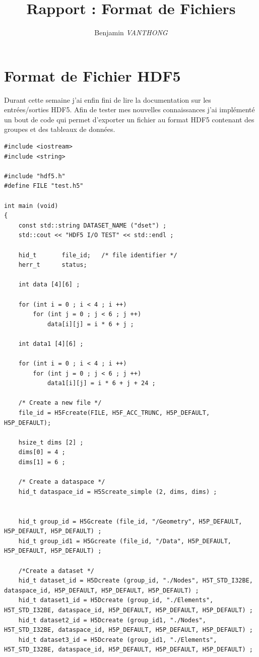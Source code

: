 \documentclass[12pt]{article}
\title {Rapport : Format de Fichiers}
\author {Benjamin \emph{VANTHONG}}
\begin{document}
\maketitle 
\section {Format de Fichier HDF5}

Durant cette semaine j'ai enfin fini de lire la documentation sur les entrées/sorties HDF5. Afin de tester mes nouvelles connaissances j'ai implémenté un bout de code qui permet d'exporter un fichier au format HDF5 contenant des groupes et des tableaux de données.
\begin{lstlisting}
#include <iostream>
#include <string>

#include "hdf5.h"
#define FILE "test.h5"

int main (void)
{
    const std::string DATASET_NAME ("dset") ;
    std::cout << "HDF5 I/O TEST" << std::endl ;

    hid_t       file_id;   /* file identifier */
    herr_t      status;

    int data [4][6] ;

    for (int i = 0 ; i < 4 ; i ++)
        for (int j = 0 ; j < 6 ; j ++)
            data[i][j] = i * 6 + j ;

    int data1 [4][6] ;

    for (int i = 0 ; i < 4 ; i ++)
        for (int j = 0 ; j < 6 ; j ++)
            data1[i][j] = i * 6 + j + 24 ;

    /* Create a new file */
    file_id = H5Fcreate(FILE, H5F_ACC_TRUNC, H5P_DEFAULT, H5P_DEFAULT);

    hsize_t dims [2] ;
    dims[0] = 4 ;
    dims[1] = 6 ;

    /* Create a dataspace */
    hid_t dataspace_id = H5Screate_simple (2, dims, dims) ;

   
    hid_t group_id = H5Gcreate (file_id, "/Geometry", H5P_DEFAULT, H5P_DEFAULT, H5P_DEFAULT) ;
    hid_t group_id1 = H5Gcreate (file_id, "/Data", H5P_DEFAULT, H5P_DEFAULT, H5P_DEFAULT) ;
    
    /*Create a dataset */
    hid_t dataset_id = H5Dcreate (group_id, "./Nodes", H5T_STD_I32BE, dataspace_id, H5P_DEFAULT, H5P_DEFAULT, H5P_DEFAULT) ;
    hid_t dataset1_id = H5Dcreate (group_id, "./Elements", H5T_STD_I32BE, dataspace_id, H5P_DEFAULT, H5P_DEFAULT, H5P_DEFAULT) ; 
    hid_t dataset2_id = H5Dcreate (group_id1, "./Nodes", H5T_STD_I32BE, dataspace_id, H5P_DEFAULT, H5P_DEFAULT, H5P_DEFAULT) ; 
    hid_t dataset3_id = H5Dcreate (group_id1, "./Elements", H5T_STD_I32BE, dataspace_id, H5P_DEFAULT, H5P_DEFAULT, H5P_DEFAULT) ; 


\end{lstlisting}
\end{document}
